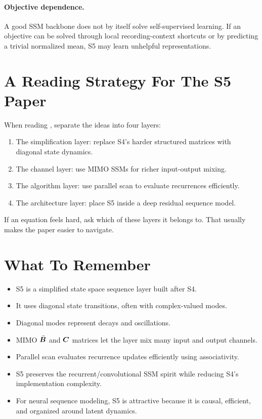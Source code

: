 \paragraph{Objective dependence.}
A good SSM backbone does not by itself solve self-supervised learning. If an objective can
be solved through local recording-context shortcuts or by predicting a trivial normalized
mean, S5 may learn unhelpful representations.

\section{A Reading Strategy For The S5 Paper}

When reading \citet{smith2023s5}, separate the ideas into four layers:

\begin{enumerate}
  \item The simplification layer: replace S4's harder structured matrices with diagonal
  state dynamics.
  \item The channel layer: use MIMO SSMs for richer input-output mixing.
  \item The algorithm layer: use parallel scan to evaluate recurrences efficiently.
  \item The architecture layer: place S5 inside a deep residual sequence model.
\end{enumerate}

If an equation feels hard, ask which of these layers it belongs to. That usually makes the
paper easier to navigate.

\section{What To Remember}

\begin{itemize}
  \item S5 is a simplified state space sequence layer built after S4.
  \item It uses diagonal state transitions, often with complex-valued modes.
  \item Diagonal modes represent decays and oscillations.
  \item MIMO $\bar{\bm{B}}$ and $\bm{C}$ matrices let the layer mix many input and output
  channels.
  \item Parallel scan evaluates recurrence updates efficiently using associativity.
  \item S5 preserves the recurrent/convolutional SSM spirit while reducing S4's
  implementation complexity.
  \item For neural sequence modeling, S5 is attractive because it is causal, efficient,
  and organized around latent dynamics.
\end{itemize}

